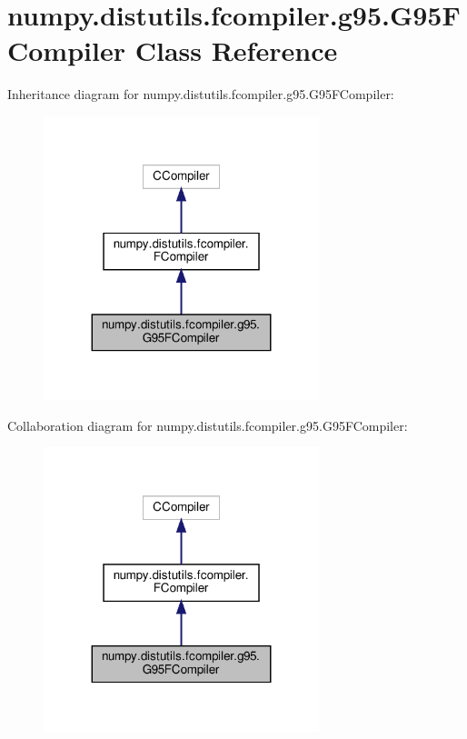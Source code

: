 \hypertarget{classnumpy_1_1distutils_1_1fcompiler_1_1g95_1_1G95FCompiler}{}\section{numpy.\+distutils.\+fcompiler.\+g95.\+G95\+F\+Compiler Class Reference}
\label{classnumpy_1_1distutils_1_1fcompiler_1_1g95_1_1G95FCompiler}


Inheritance diagram for numpy.\+distutils.\+fcompiler.\+g95.\+G95\+F\+Compiler\+:
\nopagebreak
\begin{figure}[H]
\begin{center}
\leavevmode
\includegraphics[width=227pt]{classnumpy_1_1distutils_1_1fcompiler_1_1g95_1_1G95FCompiler__inherit__graph}
\end{center}
\end{figure}


Collaboration diagram for numpy.\+distutils.\+fcompiler.\+g95.\+G95\+F\+Compiler\+:
\nopagebreak
\begin{figure}[H]
\begin{center}
\leavevmode
\includegraphics[width=227pt]{classnumpy_1_1distutils_1_1fcompiler_1_1g95_1_1G95FCompiler__coll__graph}
\end{center}
\end{figure}

